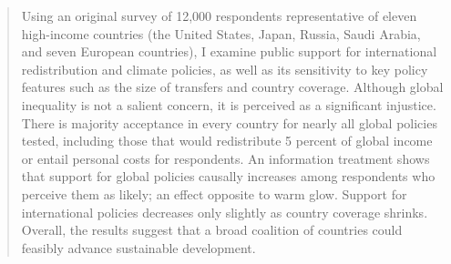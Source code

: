 \documentclass[12pt,english]{article}
\begin{document}
\begin{abstract}

Using an original survey of 12,000 respondents representative of eleven high-income countries (the United States, Japan, Russia, Saudi Arabia, and seven European countries), I examine public support for international redistribution and climate policies, as well as its sensitivity to key policy features such as the size of transfers and country coverage. Although global inequality is not a salient concern, it is perceived as a significant injustice. There is majority acceptance in every country for nearly all global policies tested, including those that would redistribute 5 percent of global income or entail personal costs for respondents. An information treatment shows that support for global policies causally increases among respondents who perceive them as likely; an effect opposite to warm glow. Support for international policies decreases only slightly as country coverage shrinks. Overall, the results 
suggest that a broad coalition of countries could feasibly advance sustainable development. 





\end{abstract}
\end{document}
